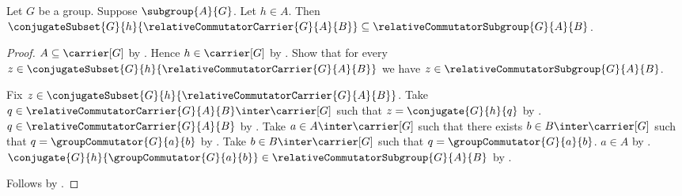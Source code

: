 \begin{corollary}\label{left_subgroup_conjugates_relative_commutator_carrier}
    Let $G$ be a group.
    Suppose $\subgroup{A}{G}$.
    Let $h\in A$.
    Then
        $\conjugateSubset{G}{h}{
            \relativeCommutatorCarrier{G}{A}{B}}\subseteq
            \relativeCommutatorSubgroup{G}{A}{B}$.
\end{corollary}
\begin{proof}
    $A\subseteq\carrier[G]$ by .
    Hence $h\in\carrier[G]$ by .
    Show that for every
        $z\in\conjugateSubset{G}{h}{
            \relativeCommutatorCarrier{G}{A}{B}}$ we have
        $z\in\relativeCommutatorSubgroup{G}{A}{B}$.
    \begin{subproof}
        Fix
            $z\in\conjugateSubset{G}{h}{
                \relativeCommutatorCarrier{G}{A}{B}}$.
        Take
            $q\in\relativeCommutatorCarrier{G}{A}{B}
                \inter\carrier[G]$ such that
            $z=\conjugate{G}{h}{q}$ by
            .
        $q\in\relativeCommutatorCarrier{G}{A}{B}$ by
            .
        Take $a\in A\inter\carrier[G]$ such that there exists
            $b\in B\inter\carrier[G]$ such that
            $q=\groupCommutator{G}{a}{b}$ by
            .
        Take $b\in B\inter\carrier[G]$ such that
            $q=\groupCommutator{G}{a}{b}$.
        $a\in A$ by .
        $\conjugate{G}{h}{\groupCommutator{G}{a}{b}}\in
            \relativeCommutatorSubgroup{G}{A}{B}$ by
            .
    \end{subproof}
    Follows by .
\end{proof}

